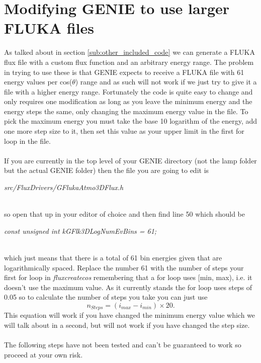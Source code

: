 \documentclass[12pt]{article}
\numberwithin{equation}{section}
\numberwithin{figure}{section}
\begin{document}
\section{Modifying GENIE to use larger FLUKA files} %
\label{sec:appendix_a_modifying_genie_to_use_larger_fluka_files}
As talked about in section \ref{sub:other_included_code} we can generate a FLUKA flux file with a custom flux function and an arbitrary energy range. The problem in trying to use these is that GENIE expects to receive a FLUKA file with 61 energy values per cos($\theta$) range and as such will not work if we just try to give it a file with a higher energy range. Fortunately the code is quite easy to change and only requires one modification as long as you leave the minimum energy and the energy steps the same, only changing the maximum energy value in the file. To pick the maximum energy you must take the base 10 logarithm of the energy, add one more step size to it, then set this value as your upper limit in the first for loop in the file. \\
\\
If you are currently in the top level of your GENIE directory (not the lamp folder but the actual GENIE folder) then the file you are going to edit is\\
\centerline{ \emph{src/FluxDrivers/GFlukaAtmo3DFlux.h}}\\
so open that up in your editor of choice and then find line 50 which should be\\
\centerline {\emph{const unsigned int kGFlk3DLogNumEvBins       = 61;}}\\
which just means that there is a total of 61 bin energies given that are logarithmically spaced. Replace the number 61 with the number of steps your first for loop in \emph{flux\textunderscore create\textunderscore cos} remembering that a for loop uses [min, max), i.e. it doesn't use the maximum value. As it currently stands the for loop uses steps of 0.05 so to calculate the number of steps you take you can just use 
\begin{equation}
    n_{Steps} = (i_{max} - i_{min})\times 20.
    \label{eq:steps}
\end{equation}
This equation will work if you have changed the minimum energy value which we will talk about in a second, but will not work if you have changed the step size.\\
\\
The following steps have not been tested and can't be guaranteed to work so proceed at your own risk.\\
\end{document}
